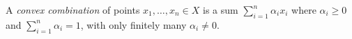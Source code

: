 A \emph{convex combination} of points $x_1, \ldots, x_n \in X$ is a sum $\sum_{i=1}^{n} \alpha_i x_i$ where $\alpha_i \geqslant 0$ and $\sum_{i=1}^{n} \alpha_i = 1$, with only finitely many $\alpha_i \neq 0$.
